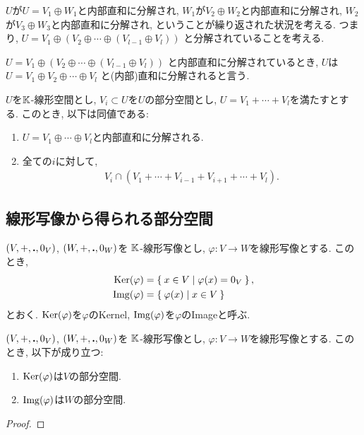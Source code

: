 $U$が$U=V_1\oplus W_1$と内部直和に分解され,
$W_1$が$V_2\oplus W_2$と内部直和に分解され,
$W_2$が$V_3\oplus W_3$と内部直和に分解され,
ということが繰り返された状況を考える.
つまり,
$U=V_1\oplus (V_2\oplus \cdots \oplus(V_{l-1}\oplus V_l))$
と分解されていることを考える.
\begin{definition}
$U=V_1\oplus (V_2\oplus \cdots \oplus(V_{l-1}\oplus V_l))$
と内部直和に分解されているとき,
$U$は$U=V_1\oplus V_2\oplus \cdots \oplus V_l$
と(内部)直和に分解されると言う.
\end{definition}
\begin{prop}
  $U$を$\mathbb{K}$-線形空間とし, $V_i\subset U$を$U$の部分空間とし,
  $U=V_1+\cdots+ V_l$を満たすとする.
  このとき, 以下は同値である:
  \begin{enumerate}
  \item $U=V_1\oplus \cdots \oplus V_l$と内部直和に分解される.
  \item 全ての$i$に対して,
    \begin{align*}
      V_i \cap (V_1+\cdots+ V_{i-1}+V_{i+1}+\cdots+ V_{l}).
    \end{align*}
  \end{enumerate}
\end{prop}

\subsection{線形写像から得られる部分空間}

\begin{definition}
  $(V,+,\mathbin{\boldsymbol{.}},0_V)$,
  $(W,+,\mathbin{\boldsymbol{.}},0_W)$を
  $\mathbb{K}$-線形写像とし,
  $\varphi\colon V\to W$を線形写像とする.
  このとき,
  \begin{align*}
    \operatorname{Ker}(\varphi)&=\Set{x\in V|\varphi(x)=0_V  },\\
    \operatorname{Img}(\varphi)&=\Set{\varphi(x)|x\in V}
  \end{align*}
  とおく. $\operatorname{Ker}(\varphi)$を$\varphi$のKernel,
  $\operatorname{Img}(\varphi)$を$\varphi$のImageと呼ぶ.
\end{definition}
\begin{prop}
  $(V,+,\mathbin{\boldsymbol{.}},0_V)$,
  $(W,+,\mathbin{\boldsymbol{.}},0_W)$を
  $\mathbb{K}$-線形写像とし,
  $\varphi\colon V\to W$を線形写像とする.
このとき, 以下が成り立つ:
\begin{enumerate}
  \item $\operatorname{Ker}(\varphi)$は$V$の部分空間.
  \item $\operatorname{Img}(\varphi)$は$W$の部分空間.
\end{enumerate}
\end{prop}
\begin{proof}\end{proof}

